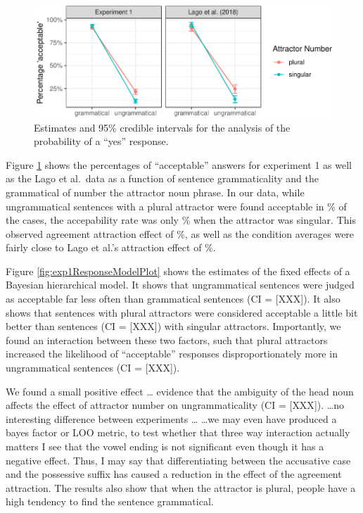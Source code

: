 \documentclass[english,doc]{apa6}
\begin{document}
\begin{figure}
\centering
\includegraphics{paper_draft_files/figure-latex/exp1AvgResponse-1.pdf}
\caption{\label{fig:exp1AvgResponse}Estimates and 95\% credible intervals for the analysis of the probability of a \enquote{yes} response.}
\end{figure}

Figure \ref{fig:exp1AvgResponse} shows the percentages of \enquote{acceptable} answers for experiment 1 as well as the Lago et al.~data as a function of sentence grammaticality and the grammatical of number the attractor noun phrase. In our data, while ungrammatical sentences with a plural attractor were found acceptable in \% of the cases, the accepability rate was only \% when the attractor was singular.
This observed agreement attraction effect of \%, as well as the condition averages were fairly close to Lago et al.'s attraction effect of \%.

Figure \ref{fig:exp1ResponseModelPlot} shows the estimates of the fixed effects of a Bayesian hierarchical model. It shows that ungrammatical sentences were judged as acceptable far less often than grammatical sentences (CI = {[}XXX{]}). It also shows that sentences with plural attractors were considered acceptable a little bit better than sentences (CI = {[}XXX{]}) with singular attractors. Importantly, we found an interaction between these two factors, such that plural attractors increased the likelihood of \enquote{acceptable} responses disproportionately more in ungrammatical sentences (CI = {[}XXX{]}).

We found a small positive effect \ldots
evidence that the ambiguity of the head noun affects the effect of attractor number on ungrammaticality (CI = {[}XXX{]}).
\ldots no interesting difference between experiments \ldots
\ldots we may even have produced a bayes factor or LOO metric, to test whether that three way interaction actually matters
I see that the vowel ending is not significant even though it has a negative effect.
Thus, I may say that differentiating between the accusative case and the possessive suffix has caused a reduction in the effect of the agreement attraction. The results also show that when the attractor is plural, people have a high tendency to find the sentence grammatical.
\end{document}
